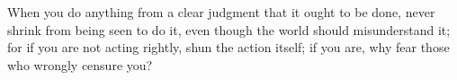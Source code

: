 When you do anything from a clear judgment that it ought to be done,
never shrink from being seen to do it, even though the world should
misunderstand it; for if you are not acting rightly, shun the action
itself; if you are, why fear those who wrongly censure you?
